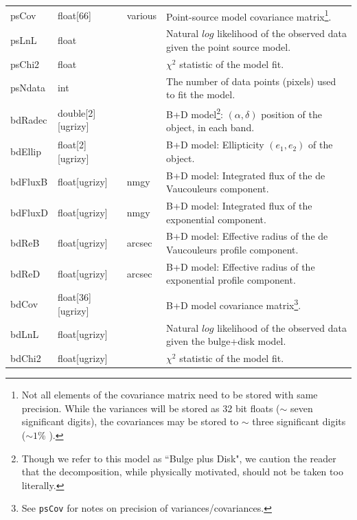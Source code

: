 \documentclass[12pt]{article}
\begin{document}
\begin{center}
\begin{longtable}{p{3cm}p{2cm}p{2cm}p{5cm}}
psCov & float[66] & various & Point-source model covariance matrix\footnote{Not all elements of the covariance matrix need to be stored with same precision. While the variances will be stored as 32 bit floats ($\sim$ seven significant digits), the covariances may be stored to $\sim$ three significant digits ($\sim 1$\% ).}. \\

psLnL & float & ~ & Natural $log$ likelihood of the observed data given the point source model. \\

psChi2 & float & ~ & $\chi^2$ statistic of the model fit. \\

psNdata & int & ~ & The number of data points (pixels) used to fit the model. \\


bdRadec & double[2][ugrizy] & ~ & B+D model\footnote{Though we refer to this model as ``Bulge plus Disk", we caution the reader that the decomposition, while physically motivated, should not be taken too literally.}: $(\alpha, \delta)$ position of the object, in each band. \\

bdEllip & float[2][ugrizy] & ~ & B+D model: Ellipticity $(e_1, e_2)$ of the object. \\

bdFluxB & float[ugrizy] & nmgy & B+D model: Integrated flux of the de Vaucouleurs component. \\

bdFluxD & float[ugrizy] & nmgy & B+D model: Integrated flux of the exponential component. \\

bdReB & float[ugrizy] & arcsec & B+D model: Effective radius of the de Vaucouleurs profile component. \\

bdReD & float[ugrizy] & arcsec & B+D model: Effective radius of the exponential profile component. \\

bdCov & float[36][ugrizy] & ~ & B+D model covariance matrix\footnote{See {\tt psCov} for notes on precision of variances/covariances.}. \\

bdLnL & float[ugrizy] & ~ & Natural $log$ likelihood of the observed data given the bulge+disk model. \\

bdChi2 & float[ugrizy] & ~ & $\chi^2$ statistic of the model fit. \\


\end{longtable}
\end{center}
\end{document}
